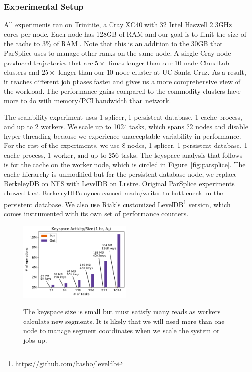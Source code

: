 \subsubsection*{Experimental Setup} All experiments ran on Trinitite, a Cray
XC40 with 32 Intel Haswell 2.3GHz cores per node.  Each node has 128GB of RAM
and our goal is to limit the size of the cache to 3\% of RAM . Note that this
is an addition to the 30GB that ParSplice uses to manage other ranks on the
same node.  A single Cray node produced trajectories that are \(5\times\) times
longer than our 10 node CloudLab clusters and \(25\times\) longer than our 10
node cluster at UC Santa Cruz. As a result, it reaches different job phases faster and
gives us a more comprehensive view of the workload. The performance gains
compared to the commodity clusters have more to do with memory/PCI bandwidth
than network.

The scalability experiment uses 1 splicer, 1 persistent database, 1 cache
process, and up to 2 workers. We scale up to 1024 tasks, which spans 32 nodes
and disable hyper-threading because we experience unacceptable variability in
performance. For the rest of the experiments, we use 8 nodes, 1 splicer, 1
persistent database, 1 cache process, 1 worker, and up to 256 tasks.  The
keyspace analysis that follows is for the cache on the worker node, which is
circled in Figure~\ref{fig:parsplice}.  The cache hierarchy is unmodified but
for the persistent database node, we replace BerkeleyDB on NFS with LevelDB on
Lustre. Original ParSplice experiments showed that BerkeleyDB's syncs caused
reads/writes to bottleneck on the persistent database. We also use Riak's
customized LevelDB\footnote{https://github.com/basho/leveldb} version, which
comes instrumented with its own set of performance counters.

\begin{figure}[t]
  \noindent\includegraphics[width=0.5\textwidth]{figures/methodology-keyspace.png}\\
  \caption{The keyspace size is small but must satisfy many reads as workers
  calculate new segments. It is likely that we will need
  more than one node to manage segment coordinates when we scale the system or jobs up.
  \label{fig:methodology-keyspace}}
\end{figure}

